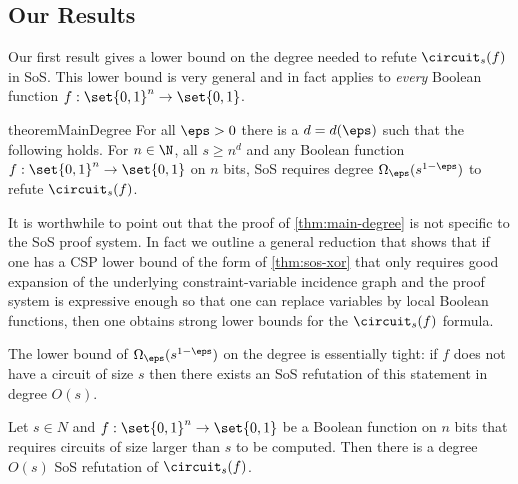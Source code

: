 \subsection{Our Results}

Our first result gives a lower bound on the degree needed to refute
$\circuit_s(f)$ in SoS.  This lower bound is very general and in fact
applies to \emph{every} Boolean function
$f: \set{0,1}^n \rightarrow \set{0,1}$.

\begin{restatable}{theorem}{MainDegree}
  \label{thm:main-degree}
  For all $\eps > 0$ there is a $d = d(\eps)$ such that the following
  holds.  For $n \in \N$, all $s \ge n^{d}$ and any Boolean function
  $f:\set{0,1}^{n} \rightarrow \set{0,1}$ on $n$ bits, SoS requires
  degree $\Omega_\eps(s^{1-\eps})$ to refute $\circuit_s(f)$.
\end{restatable}

It is worthwhile to point out that the proof of \cref{thm:main-degree}
is not specific to the SoS proof system. In fact we outline a general
reduction that shows that if one has a CSP lower bound of the form of
\cref{thm:sos-xor} that only requires good expansion of the underlying
constraint-variable incidence graph and the proof system is expressive
enough so that one can replace variables by local Boolean functions,
then one obtains strong lower bounds for the $\circuit_s(f)$ formula.

The lower bound of $\Omega_\eps(s^{1-\eps})$ on the degree is
essentially tight: if $f$ does not have a circuit of size $s$ then
there exists an SoS refutation of this statement in degree $O(s)$.

\begin{proposition}
  Let $s \in N$ and $f: \set{0,1}^n \rightarrow \set{0,1}$ be a
  Boolean function on $n$ bits that requires circuits of size larger
  than $s$ to be computed. Then there is a degree $O(s)$ SoS
  refutation of $\circuit_s(f)$.
\end{proposition}

